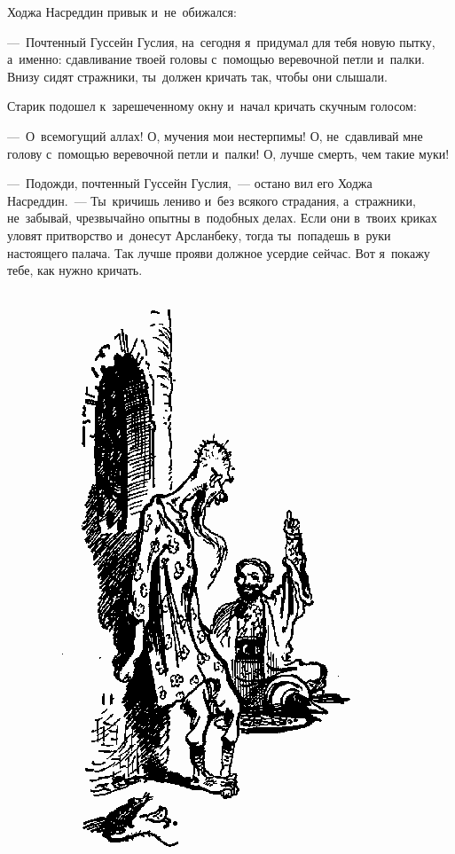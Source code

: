 \documentclass[12pt,a4paper]{book}
\begin{document}
Ходжа Насреддин привык и~не~обижался:

—~Почтенный Гуссейн Гуслия, на~сегодня я~придумал для тебя новую пытку, а~именно: сдавливание твоей головы с~помощью веревочной петли и~палки. Внизу сидят стражники, ты~должен кричать так, чтобы они слышали.

Старик подошел к~зарешеченному окну и~начал кричать скучным голосом:

—~О~всемогущий аллах! О, мучения мои нестерпимы! О, не~сдавливай мне голову с~помощью веревочной петли и~палки! О, лучше смерть, чем такие муки!

—~Подожди, почтенный Гуссейн Гуслия,~— остано вил его Ходжа Насреддин.~— Ты~кричишь лениво и~без всякого страдания, а~стражники, не~забывай, чрезвычайно опытны в~подобных делах. Если они в~твоих криках уловят притворство и~донесут Арсланбеку, тогда ты~попадешь в~руки настоящего палача. Так лучше прояви должное усердие сейчас. Вот я~покажу тебе, как нужно кричать.

\begin{figure}[p]
\centering
\includegraphics[scale=0.85]{14.png}
\end{figure}
\end{document}
